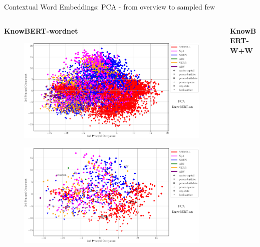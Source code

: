 \begin{frame}{Contextual Word Embeddings: PCA - from overview to sampled few}
    \begin{columns}
        \begin{column}{0.5\textwidth}
        \textbf{KnowBERT-wordnet}
            \begin{figure}
                \centering
                \includegraphics[height=0.15\textheight]{graphics/contextual_embeddings/PCA_9512_2_3_knowbert_wordnetNone_title.eps}
            \end{figure}
            \begin{figure}
                \centering
                \includegraphics[height=0.55\textheight]{graphics/contextual_embeddings/PCA_1024_2_3_knowbert_wordnet_annotated_title.eps}
            \end{figure}
        \end{column}
        \begin{column}{0.5\textwidth}
        \textbf{KnowBERT-W+W}
            \begin{figure}
                \centering

\end{figure}
\end{column}
\end{columns}
\end{frame}

